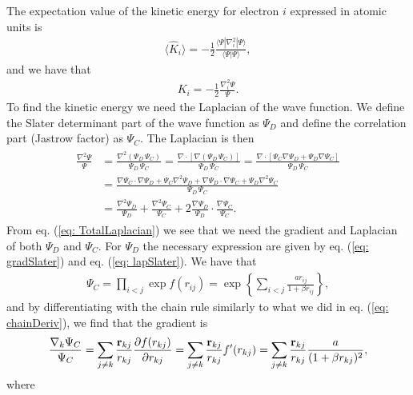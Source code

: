 \documentclass[../main.tex]{subfiles}
\begin{document}
\begin{appendices}
The expectation value of the kinetic energy for electron $i$ expressed in atomic units is 
\begin{align}
    \langle \hat{K}_i \rangle = -\frac{1}{2}\frac{\langle\Psi|\nabla_{i}^2|\Psi \rangle}{\langle\Psi|\Psi \rangle}, 
\end{align}
and we have that 
\begin{align}
    K_i = -\frac{1}{2}\frac{\nabla_{i}^{2} \Psi}{\Psi}.
\end{align}
To find the kinetic energy we need the Laplacian of the wave function. We define the Slater determinant part of the wave function as $\Psi_D$ and define the correlation part (Jastrow factor) as $\Psi_C$. The Laplacian is then 
\begin{align}\label{eq: TotalLaplacian}
\begin{split}
    \frac{\nabla^2 \Psi}{\Psi} & =  \frac{\nabla^2 ({\Psi_{D} \,  \Psi_C})}{\Psi_{D} \,  \Psi_C} = \frac{\nabla  \cdot [\nabla  {(\Psi_{D} \,  \Psi_C)}]}{\Psi_{D} \,  \Psi_C} = \frac{\nabla  \cdot [ \Psi_C \nabla  \Psi_{D} + \Psi_{D} \nabla   \Psi_C]}{\Psi_{D} \,  \Psi_C}\\
    &  =  \frac{\nabla   \Psi_C \cdot \nabla  \Psi_{D} +  \Psi_C \nabla^2 \Psi_{D} + \nabla  \Psi_{D} \cdot \nabla   \Psi_C + \Psi_{D} \nabla^2  \Psi_C}{\Psi_{D} \,  \Psi_C}\\
    & =  \frac{\nabla^2 \Psi_{D}}{\Psi_{D}} + \frac{\nabla^2  \Psi_C}{ \Psi_C} + 2 \frac{\nabla  \Psi_{D}}{\Psi_{D}}\cdot\frac{\nabla   \Psi_C}{ \Psi_C}.
\end{split}
\end{align}
From eq. (\ref{eq: TotalLaplacian}) we see that we need the gradient and Laplacian of both $\Psi_D$ and $\Psi_C$. For $\Psi_D$ the necessary expression are given by eq. (\ref{eq: gradSlater}) and eq. (\ref{eq: lapSlater}). We have that 
\begin{align}
    \Psi_{C}=\prod_{i< j}\exp{f(r_{ij})}= \exp{\left\{\sum_{i<j}\frac{ar_{ij}}{1+\beta r_{ij}}\right\}},
\end{align}
and by differentiating with the chain rule similarly to what we did in eq. (\ref{eq: chainDeriv}), we find that the gradient is 
\begin{align}
    \frac{ \nabla_k \Psi_C}{ \Psi_C }= \sum_{j\ne k}\frac{{\bf r}_{kj}}{r_{kj}} \frac{\partial f(r_{kj})}{\partial r_{kj}} = \sum_{j\ne k}\frac{{\bf r}_{kj}}{r_{kj}} f'(r_{kj}) = \sum_{j\ne k}\frac{{\bf r}_{kj}}{r_{kj}}\frac{a}{(1+\beta r_{kj})^2},
\end{align}
where 
\begin{align}

\end{align}
\end{appendices}
\end{document}
